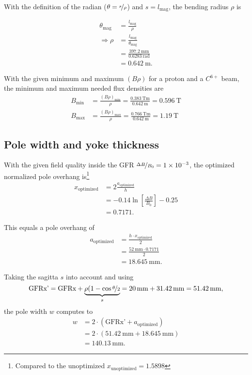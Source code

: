 \documentclass[10pt,a4paper,noendnumber=true]{scrartcl}
\begin{document}
With the definition of the radian ($\theta=\nicefrac{s}{\rho}$) and $s=l_\text{mag}$, the bending radius $\rho$ is

\begin{align}
    \theta_\text{mag} &= \frac{l_\text{mag}}{\rho} \\
    \Rightarrow \rho  &= \frac{l_\text{mag}}{\theta_\text{mag}}\\
    &= \frac{\SI{397.2}{\mm}}{\SI{0.6283}{\radian}} \nonumber\\
    &= \SI{0.642}{\meter}. \nonumber
\end{align}

With the given minimum and maximum $(B\rho)$ for a proton and a $C^{6+}$ beam, the minimum and maximum needed flux densities are
\begin{align}
    B_\text{min} &= \frac{(B \rho)_\text{min}}{\rho} = \frac{\SI{0.383}{\tesla\meter}}{\SI{0.642}{\meter}} = \SI{0.596}{\tesla}\\
    B_\text{max} &= \frac{(B \rho)_\text{max}}{\rho} = \frac{\SI{0.766}{\tesla\meter}}{\SI{0.642}{\meter}} = \SI{1.19}{\tesla}
\end{align}


\subsection{Pole width and yoke thickness}
With the given field quality inside the GFR $\nicefrac{\Delta B}{B_0} = \num{1e-3}$,
the optimized normalized pole overhang is\footnote{Compared to the unoptimized $x_\text{unoptimized}= 1.5898$}
\begin{align}
    x_\text{optimized} &= 2\frac{a_\text{optimized}}{h} \\
    &= -0.14 \ln\left[\frac{\Delta B}{B_0}\right] -0.25 \nonumber\\
    &= 0.7171. \nonumber
\end{align}

This equals a pole overhang of
\begin{align}
    a_\text{optimized} &= \frac{h\cdot x_\text{optimized}}{2} \\
    &= \frac{\SI{52}{\mm} \cdot 0.7171}{2} \nonumber\\
    &= \SI{18.645}{\mm}.\nonumber
\end{align}

Taking the sagitta $s$ into account and using
\begin{equation}
    \text{GFRx'} = \text{GFRx} + \underbrace{\rho(1-\cos \nicefrac{\theta}{2}}_s
    = \SI{20}{\mm} + \SI{31.42}{\mm} 
    = \SI{51.42}{\mm}, 
\end{equation}
the pole width $w$ computes to
\begin{align}
	w & = 2\cdot \left(\text{GFRx'} + a_\text{optimized}\right)            \\
	  & = 2\cdot \left(\SI{51.42}{\mm} + \SI{18.645}{\mm}\right) \nonumber \\
	  & = \SI{140.13}{\mm}. \nonumber
\end{align}
\end{document}
